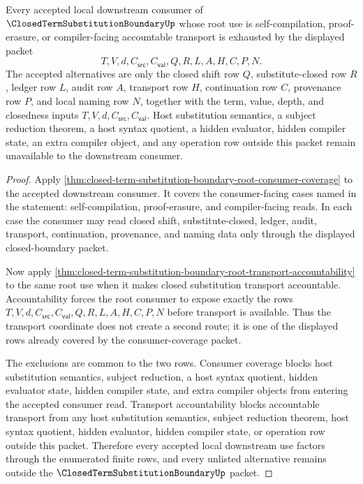 \begin{theorem}
\label{thm:closed-term-substitution-boundary-root-transport-downstream-coverage}
Every accepted local downstream consumer of $\ClosedTermSubstitutionBoundaryUp$ whose root use is self-compilation, proof-erasure, or compiler-facing accountable transport is exhausted by the displayed packet
$$
T,V,d,C_{\mathsf{src}},C_{\mathsf{val}},Q,R,L,A,H,C,P,N.
$$
The accepted alternatives are only the closed shift row $Q$, substitute-closed row $R$, ledger row $L$, audit row $A$, transport row $H$, continuation row $C$, provenance row $P$, and local naming row $N$, together with the term, value, depth, and closedness inputs $T,V,d,C_{\mathsf{src}},C_{\mathsf{val}}$. Host substitution semantics, a subject reduction theorem, a host syntax quotient, a hidden evaluator, hidden compiler state, an extra compiler object, and any operation row outside this packet remain unavailable to the downstream consumer.
\end{theorem}
\begin{proof}
Apply \autoref{thm:closed-term-substitution-boundary-root-consumer-coverage} to the accepted downstream consumer. It covers the consumer-facing cases named in the statement: self-compilation, proof-erasure, and compiler-facing reads. In each case the consumer may read closed shift, substitute-closed, ledger, audit, transport, continuation, provenance, and naming data only through the displayed closed-boundary packet.

Now apply \autoref{thm:closed-term-substitution-boundary-root-transport-accountability} to the same root use when it makes closed substitution transport accountable. Accountability forces the root consumer to expose exactly the rows $T,V,d,C_{\mathsf{src}},C_{\mathsf{val}},Q,R,L,A,H,C,P,N$ before transport is available. Thus the transport coordinate does not create a second route; it is one of the displayed rows already covered by the consumer-coverage packet.

The exclusions are common to the two rows. Consumer coverage blocks host substitution semantics, subject reduction, a host syntax quotient, hidden evaluator state, hidden compiler state, and extra compiler objects from entering the accepted consumer read. Transport accountability blocks accountable transport from any host substitution semantics, subject reduction theorem, host syntax quotient, hidden evaluator, hidden compiler state, or operation row outside this packet. Therefore every accepted local downstream use factors through the enumerated finite rows, and every unlisted alternative remains outside the $\ClosedTermSubstitutionBoundaryUp$ packet.
\end{proof}
